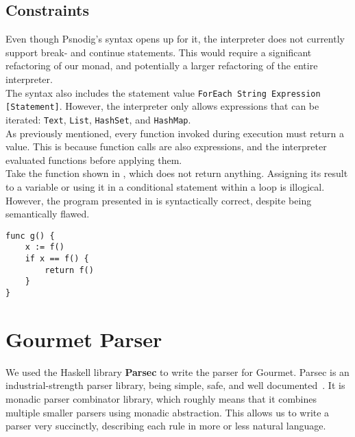\subsection{Constraints}

Even though Psnodig's syntax opens up for it, the interpreter does not currently support break- and continue statements. This would require a significant refactoring of our monad, and potentially a larger refactoring of the entire interpreter. \\

The syntax also includes the statement value \texttt{ForEach String Expression [Statement]}. However, the interpreter only allows expressions that can be iterated: \texttt{Text}, \texttt{List}, \texttt{HashSet}, and \texttt{HashMap}. \\

As previously mentioned, every function invoked during execution must return a value. This is because function calls are also expressions, and the interpreter evaluated functions before applying them. \\

Take the function shown in , which does not return anything. Assigning its result to a variable or using it in a conditional statement within a loop is illogical. However, the program presented in  is syntactically correct, despite being semantically flawed. \\

\begin{lstlisting}[caption={A syntactically correct Gourmet program, including three function call expressions.}, captionpos=b, label={crazyProg}]
func g() {
    x := f()
    if x == f() {
        return f()
    }
}
\end{lstlisting}

\section{Gourmet Parser}

We used the Haskell library \textbf{Parsec} to write the parser for Gourmet. Parsec is an industrial-strength parser library, being simple, safe, and well documented~\cite{parsec}. It is monadic parser combinator library, which roughly means that it combines multiple smaller parsers using monadic abstraction. This allows us to write a parser very succinctly, describing each rule in more or less natural language. \\

